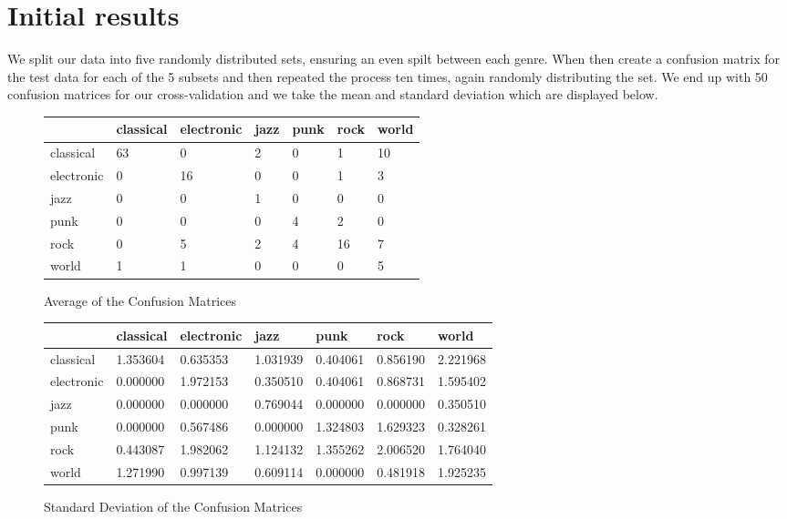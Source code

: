 \documentclass[12pt]{article}
\begin{document}
\section{Initial results}
We split our data into five randomly distributed sets, ensuring an even spilt between each genre. When then create a confusion matrix for the test data for each of the 5 subsets and then repeated the process ten times, again randomly distributing the set. We end up with 50 confusion matrices for our cross-validation and we take the mean and standard deviation which are displayed below. 
\begin{figure}[h!]
\centering
 \begin{tabular}{l| |l | l | l | l | l | l | }
&classical &electronic& jazz &punk& rock &world \\ \hline \hline
classical&63 & 0 & 2 & 0 & 1 & 10 \\ \hline 
electronic&0 & 16 & 0 & 0 & 1 & 3 \\ \hline 
jazz&0 & 0 & 1 & 0 & 0 & 0 \\ \hline 
punk&0 & 0 & 0 & 4 & 2 & 0 \\ \hline 
rock&0 & 5 & 2 & 4 & 16 & 7 \\ \hline 
world&1 & 1 & 0 & 0 & 0 & 5 \\ \hline 
\end{tabular}
\caption{Average of the Confusion Matrices} 
\end{figure}


\begin{figure}[h!]
\centering
 \begin{tabular}{l| |l | l | l | l | l | l | }
&classical &electronic& jazz &punk& rock &world \\ \hline \hline
classical& 1.353604 & 0.635353 & 1.031939 & 0.404061 & 0.856190 & 2.221968 \\ \hline 
electronic& 0.000000 & 1.972153 & 0.350510 & 0.404061 & 0.868731 & 1.595402 \\ \hline 
jazz&0.000000 & 0.000000 & 0.769044 & 0.000000 & 0.000000 & 0.350510 \\ \hline 
punk&0.000000 & 0.567486 & 0.000000 & 1.324803 & 1.629323 & 0.328261 \\ \hline 
rock&0.443087 & 1.982062 & 1.124132 & 1.355262 & 2.006520 & 1.764040 \\ \hline 
world&1.271990 & 0.997139 & 0.609114 & 0.000000 & 0.481918 & 1.925235 \\ \hline 
\end{tabular}
\caption{Standard Deviation of the Confusion Matrices} 
\end{figure}
\end{document}
